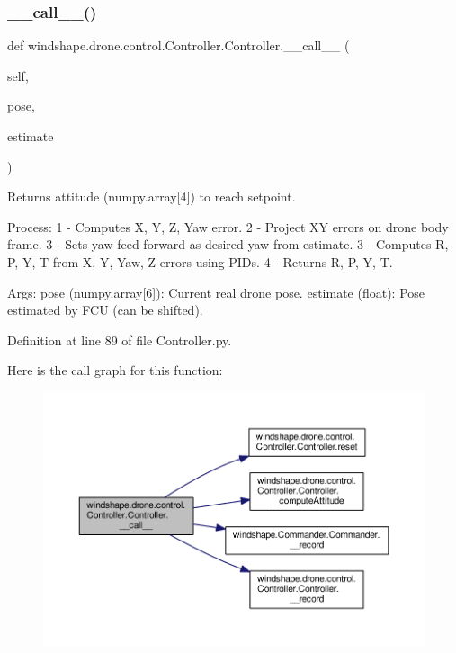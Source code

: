 \subsubsection{\texorpdfstring{\+\_\+\+\_\+call\+\_\+\+\_\+()}{\_\_call\_\_()}}
{\footnotesize\ttfamily def windshape.\+drone.\+control.\+Controller.\+Controller.\+\_\+\+\_\+call\+\_\+\+\_\+ (\begin{DoxyParamCaption}\item[{}]{self,  }\item[{}]{pose,  }\item[{}]{estimate }\end{DoxyParamCaption})}

\begin{DoxyVerb}Returns attitude (numpy.array[4]) to reach setpoint.

Process:
    1 - Computes X, Y, Z, Yaw error.
    2 - Project XY errors on drone body frame.
    3 - Sets yaw feed-forward as desired yaw from estimate.
    3 - Computes R, P, Y, T from X, Y, Yaw, Z errors using PIDs.
    4 - Returns R, P, Y, T.

Args:
    pose (numpy.array[6]): Current real drone pose.
    estimate (float): Pose estimated by FCU (can be shifted).
\end{DoxyVerb}
 

Definition at line 89 of file Controller.\+py.

Here is the call graph for this function\+:\nopagebreak
\begin{figure}[H]
\begin{center}
\leavevmode
\includegraphics[width=350pt]{classwindshape_1_1drone_1_1control_1_1_controller_1_1_controller_a4ba4d98a9925ce20b7f3741c1eb9b3f4_cgraph}
\end{center}
\end{figure}
\mbox{\label{classwindshape_1_1drone_1_1control_1_1_controller_1_1_controller_a02b5b4f02801fb76acaa744686fc9342}} 
